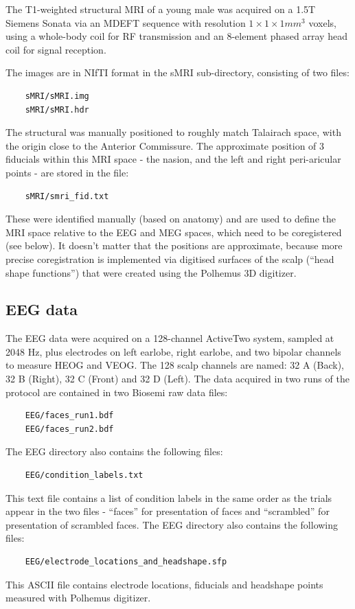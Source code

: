The T1-weighted structural MRI of a young male was acquired on a 1.5T Siemens Sonata via an MDEFT sequence with resolution $1 \times 1 \times 1 mm^3$ voxels, using a whole-body coil for RF transmission and an 8-element phased array head coil for signal reception.

The images are in NIfTI format in the sMRI sub-directory, consisting of two files:
\begin{verbatim}
    sMRI/sMRI.img
    sMRI/sMRI.hdr
\end{verbatim}
The structural was manually positioned to roughly match Talairach space, with the origin close to the Anterior Commissure.
The approximate position of 3 fiducials within this MRI space - the nasion, and the left and right peri-aricular points - are stored in the file:
\begin{verbatim}
    sMRI/smri_fid.txt
\end{verbatim}
These were identified manually (based on anatomy) and are used to define the MRI space relative to the EEG and MEG spaces, which need to be coregistered (see below). It doesn't matter that the positions are approximate, because more precise coregistration is implemented via digitised surfaces of the scalp (``head shape functions'') that were created using the Polhemus 3D digitizer.

\subsection{EEG data}

The EEG data were acquired on a 128-channel ActiveTwo system, sampled at 2048 Hz, plus electrodes on left earlobe, right earlobe, and two bipolar channels to measure HEOG and VEOG. The 128 scalp channels are named: 32 A (Back), 32 B (Right), 32 C (Front) and 32 D (Left). The data acquired in two runs of the protocol are contained in two Biosemi raw data files:
\begin{verbatim}
    EEG/faces_run1.bdf
    EEG/faces_run2.bdf
\end{verbatim}

The EEG directory also contains the following files:
\begin{verbatim}
    EEG/condition_labels.txt
\end{verbatim}
This text file contains a list of condition labels in the same order as the trials appear in the two files - ``faces'' for presentation of faces and ``scrambled'' for presentation of scrambled faces.
The EEG directory also contains the following files:
\begin{verbatim}
    EEG/electrode_locations_and_headshape.sfp
\end{verbatim}
This ASCII file contains electrode locations, fiducials and headshape points measured with Polhemus digitizer.

